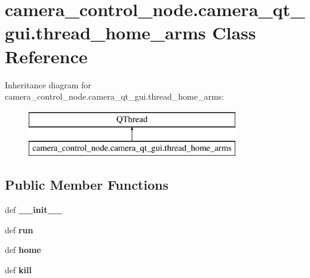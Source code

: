 \hypertarget{classcamera__control__node_1_1camera__qt__gui_1_1thread__home__arms}{\section{camera\-\_\-control\-\_\-node.\-camera\-\_\-qt\-\_\-gui.\-thread\-\_\-home\-\_\-arms Class Reference}
\label{classcamera__control__node_1_1camera__qt__gui_1_1thread__home__arms}
}
Inheritance diagram for camera\-\_\-control\-\_\-node.\-camera\-\_\-qt\-\_\-gui.\-thread\-\_\-home\-\_\-arms\-:\begin{figure}[H]
\begin{center}
\leavevmode
\includegraphics[height=2.000000cm]{classcamera__control__node_1_1camera__qt__gui_1_1thread__home__arms}
\end{center}
\end{figure}
\subsection*{Public Member Functions}
\begin{DoxyCompactItemize}
\item 
\hypertarget{classcamera__control__node_1_1camera__qt__gui_1_1thread__home__arms_a120fc8a711b3b49b8af9fac00c975b0a}{def {\bfseries \-\_\-\-\_\-init\-\_\-\-\_\-}}\label{classcamera__control__node_1_1camera__qt__gui_1_1thread__home__arms_a120fc8a711b3b49b8af9fac00c975b0a}

\item 
\hypertarget{classcamera__control__node_1_1camera__qt__gui_1_1thread__home__arms_af7ddce6b31eb38db57f1d9156d6527b1}{def {\bfseries run}}\label{classcamera__control__node_1_1camera__qt__gui_1_1thread__home__arms_af7ddce6b31eb38db57f1d9156d6527b1}

\item 
\hypertarget{classcamera__control__node_1_1camera__qt__gui_1_1thread__home__arms_abc53a2d4089b0cc6aa21b72c1f66942a}{def {\bfseries home}}\label{classcamera__control__node_1_1camera__qt__gui_1_1thread__home__arms_abc53a2d4089b0cc6aa21b72c1f66942a}

\item 
\hypertarget{classcamera__control__node_1_1camera__qt__gui_1_1thread__home__arms_a182fa869199ea677a5c6a9849ebcbb3a}{def {\bfseries kill}}\label{classcamera__control__node_1_1camera__qt__gui_1_1thread__home__arms_a182fa869199ea677a5c6a9849ebcbb3a}

\end{DoxyCompactItemize}
